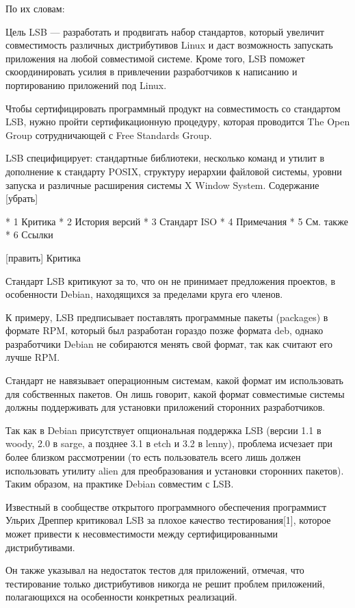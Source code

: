 По их словам:

    Цель LSB — разработать и продвигать набор стандартов, который увеличит совместимость различных дистрибутивов Linux и даст возможность запускать приложения на любой совместимой системе. Кроме того, LSB поможет скоординировать усилия в привлечении разработчиков к написанию и портированию приложений под Linux.

Чтобы сертифицировать программный продукт на совместимость со стандартом LSB, нужно пройти сертификационную процедуру, которая проводится The Open Group сотрудничающей с Free Standards Group.

LSB специфицирует: стандартные библиотеки, несколько команд и утилит в дополнение к стандарту POSIX, структуру иерархии файловой системы, уровни запуска и различные расширения системы X Window System.
Содержание
[убрать]

    * 1 Критика
    * 2 История версий
    * 3 Стандарт ISO
    * 4 Примечания
    * 5 См. также
    * 6 Ссылки

[править] Критика

Стандарт LSB критикуют за то, что он не принимает предложения проектов, в особенности Debian, находящихся за пределами круга его членов.

К примеру, LSB предписывает поставлять программные пакеты (packages) в формате RPM, который был разработан гораздо позже формата deb, однако разработчики Debian не собираются менять свой формат, так как считают его лучше RPM.

Стандарт не навязывает операционным системам, какой формат им использовать для собственных пакетов. Он лишь говорит, какой формат совместимые системы должны поддерживать для установки приложений сторонних разработчиков.

Так как в Debian присутствует опциональная поддержка LSB (версии 1.1 в woody, 2.0 в sarge, а позднее 3.1 в etch и 3.2 в lenny), проблема исчезает при более близком рассмотрении (то есть пользователь всего лишь должен использовать утилиту alien для преобразования и установки сторонних пакетов). Таким образом, на практике Debian совместим с LSB.

Известный в сообществе открытого программного обеспечения программист Ульрих Дреппер критиковал LSB за плохое качество тестирования[1], которое может привести к несовместимости между сертифицированными дистрибутивами.

Он также указывал на недостаток тестов для приложений, отмечая, что тестирование только дистрибутивов никогда не решит проблем приложений, полагающихся на особенности конкретных реализаций.

